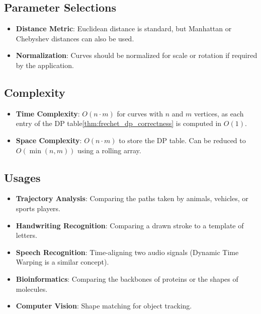 \subsection{Parameter Selections}
\begin{itemize}
  \item \textbf{Distance Metric}: Euclidean distance is standard, but Manhattan or Chebyshev distances can also be used.
  \item \textbf{Normalization}: Curves should be normalized for scale or rotation if required by the application.
\end{itemize}

\subsection{Complexity}
\begin{itemize}
  \item \textbf{Time Complexity}: $O(n \cdot m)$ for curves with $n$ and $m$ vertices, as each entry of the DP table\cref{thm:frechet_dp_correctness} is computed in $O(1)$.
  \item \textbf{Space Complexity}: $O(n \cdot m)$ to store the DP table. Can be reduced to $O(\min(n,m))$ using a rolling array.
\end{itemize}

\subsection{Usages}
\begin{itemize}
  \item \textbf{Trajectory Analysis}: Comparing the paths taken by animals, vehicles, or sports players.
  \item \textbf{Handwriting Recognition}: Comparing a drawn stroke to a template of letters.
  \item \textbf{Speech Recognition}: Time-aligning two audio signals (Dynamic Time Warping is a similar concept).
  \item \textbf{Bioinformatics}: Comparing the backbones of proteins or the shapes of molecules.
  \item \textbf{Computer Vision}: Shape matching for object tracking.
\end{itemize}

